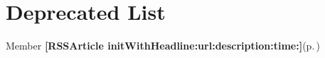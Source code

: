 \section{Deprecated List}\label{deprecated}
\label{deprecated__deprecated000002}
 \begin{description}
\item[Member {\bf \mbox{[}RSSArticle init\-With\-Headline:url:description:time:\mbox{]}}{\rm (p.\,\pageref{interfaceRSSArticle_2bec46ce7a4c7520d9d2b353f30c13d8})} ]

\end{description}
